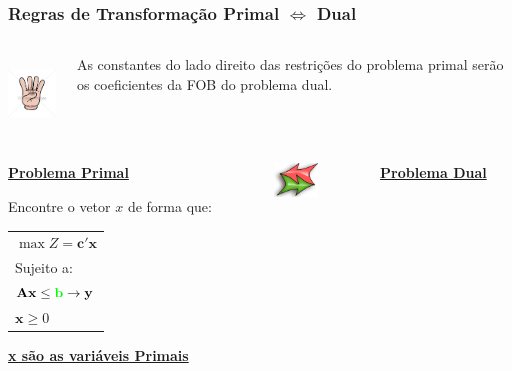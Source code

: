 \documentclass{beamer}
\begin{document}
\begin{frame}
	\frametitle{Regras de Transformação Primal $\Leftrightarrow$ Dual}
	\begin{columns}
		\begin{column}{2cm}
			\includegraphics[width=2cm,height=2cm]{number_4.jpg}
		\end{column}
		\begin{column}{8cm}
			\begin{mdframed}[backgroundcolor=orange!70]
				\centering
				As constantes do lado direito das restrições do problema primal serão os coeficientes da FOB do problema dual.
			\end{mdframed}
		\end{column}
	\end{columns}
	\begin{columns}
		\centering
		\begin{column}{4cm}
			\underline{\textbf{Problema Primal}}
			\begin{mdframed}[backgroundcolor=blue!50]
				Encontre o vetor \textbf{$x$} de forma que:
				\begin{table}
					\begin{tabular}{l}
						$ \max Z = \mathbf{c'x}$ \\
						Sujeito a: \\
						$ \mathbf{Ax} \le {\color{green} \mathbf{b}} \rightarrow \mathbf{y} $ \\
						$ \mathbf{x} \ge 0$ \\
					\end{tabular}
				\end{table}
			\end{mdframed}
			\underline{\textbf{x são as variáveis Primais}}
		\end{column}
		\begin{column}{2cm}
			\includegraphics[width=2cm,height=0.9cm]{bi-directional_arrow.png}
		\end{column}
		\begin{column}{4cm}
			\underline{\textbf{Problema Dual}}
			\begin{mdframed}[backgroundcolor=red!50]

\end{mdframed}
\end{column}
\end{columns}
\end{frame}
\end{document}
